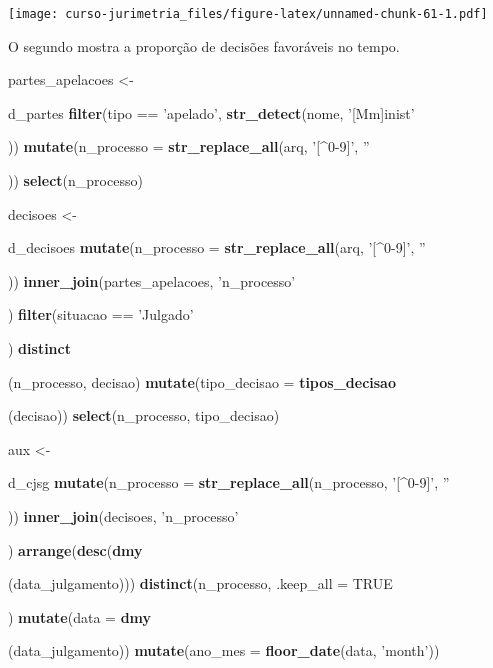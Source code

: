\documentclass[]{book}
\newenvironment{Shaded}{\begin{snugshade}}{\end{snugshade}}
\newcommand{\KeywordTok}[1]{\textcolor[rgb]{0.13,0.29,0.53}{\textbf{{#1}}}}
\newcommand{\DataTypeTok}[1]{\textcolor[rgb]{0.13,0.29,0.53}{{#1}}}
\newcommand{\StringTok}[1]{\textcolor[rgb]{0.31,0.60,0.02}{{#1}}}
\newcommand{\OtherTok}[1]{\textcolor[rgb]{0.56,0.35,0.01}{{#1}}}
\newcommand{\NormalTok}[1]{{#1}}
\begin{document}
\texttt{[image: curso-jurimetria\_files/figure-latex/unnamed-chunk-61-1.pdf]}

O segundo mostra a proporção de decisões favoráveis no tempo.

\begin{Shaded}
\begin{Highlighting}[]
\NormalTok{partes_apelacoes <-}\StringTok{ }\NormalTok{d_partes %>%}\StringTok{ }
\StringTok{  }\KeywordTok{filter}\NormalTok{(tipo ==}\StringTok{ 'apelado'}\NormalTok{, }\KeywordTok{str_detect}\NormalTok{(nome, }\StringTok{'[Mm]inist'}\NormalTok{)) %>%}\StringTok{ }
\StringTok{  }\KeywordTok{mutate}\NormalTok{(}\DataTypeTok{n_processo =} \KeywordTok{str_replace_all}\NormalTok{(arq, }\StringTok{'[^0-9]'}\NormalTok{, }\StringTok{''}\NormalTok{)) %>%}\StringTok{ }
\StringTok{  }\KeywordTok{select}\NormalTok{(n_processo)}
  
\NormalTok{decisoes <-}\StringTok{ }\NormalTok{d_decisoes %>%}\StringTok{ }
\StringTok{  }\KeywordTok{mutate}\NormalTok{(}\DataTypeTok{n_processo =} \KeywordTok{str_replace_all}\NormalTok{(arq, }\StringTok{'[^0-9]'}\NormalTok{, }\StringTok{''}\NormalTok{)) %>%}\StringTok{ }
\StringTok{  }\KeywordTok{inner_join}\NormalTok{(partes_apelacoes, }\StringTok{'n_processo'}\NormalTok{) %>%}\StringTok{ }
\StringTok{  }\KeywordTok{filter}\NormalTok{(situacao ==}\StringTok{ 'Julgado'}\NormalTok{) %>%}\StringTok{ }
\StringTok{  }\KeywordTok{distinct}\NormalTok{(n_processo, decisao) %>%}
\StringTok{  }\KeywordTok{mutate}\NormalTok{(}\DataTypeTok{tipo_decisao =} \KeywordTok{tipos_decisao}\NormalTok{(decisao)) %>%}\StringTok{ }
\StringTok{  }\KeywordTok{select}\NormalTok{(n_processo, tipo_decisao)}
  

\NormalTok{aux <-}\StringTok{ }\NormalTok{d_cjsg %>%}
\StringTok{  }\KeywordTok{mutate}\NormalTok{(}\DataTypeTok{n_processo =} \KeywordTok{str_replace_all}\NormalTok{(n_processo, }\StringTok{'[^0-9]'}\NormalTok{, }\StringTok{''}\NormalTok{)) %>%}\StringTok{ }
\StringTok{  }\KeywordTok{inner_join}\NormalTok{(decisoes, }\StringTok{'n_processo'}\NormalTok{) %>%}\StringTok{ }
\StringTok{  }\KeywordTok{arrange}\NormalTok{(}\KeywordTok{desc}\NormalTok{(}\KeywordTok{dmy}\NormalTok{(data_julgamento))) %>%}\StringTok{ }
\StringTok{  }\KeywordTok{distinct}\NormalTok{(n_processo, }\DataTypeTok{.keep_all =} \OtherTok{TRUE}\NormalTok{) %>%}\StringTok{ }
\StringTok{  }\KeywordTok{mutate}\NormalTok{(}\DataTypeTok{data =} \KeywordTok{dmy}\NormalTok{(data_julgamento)) %>%}
\StringTok{  }\KeywordTok{mutate}\NormalTok{(}\DataTypeTok{ano_mes =} \KeywordTok{floor_date}\NormalTok{(data, }\StringTok{'month'}\NormalTok{))}

}}}}}}}}}}}}}}}
\end{Highlighting}
\end{Shaded}
\end{document}
